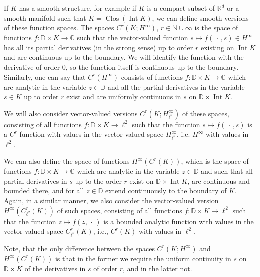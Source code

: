 \documentclass[12pt]{amsart}
\begin{document}
{\begin{list}{X}
{If \(K\) has a smooth structure, for example if \(K\) is a compact subset of ${\mathbb{R}}^d$ or a smooth manifold such that $K ={\operatorname{Clos}} \left({\operatorname{Int}} K\right)$, we can define smooth versions of these function spaces.  The spaces $C^r\left(K;H^\infty\right)$, $r\in {\mathbb{N}}\cup\infty$ is the space of functions $f:{\mathbb{D}}\times K\to {\mathbb{C}}$ such that the vector-valued function $s\mapsto f({\,\cdot\,}, s)\in H^\infty$  has all its partial derivatives (in the strong sense) up to order $r$ existing on ${\operatorname{Int}} K$  and are continuous up to the boundary.  We will identify the function with the derivative of order $0$, so the function itself is continuous up to the boundary. Similarly, one can say that $C^r\left(H^\infty\right)$ consists of functions $f:{\mathbb{D}}\times K\to {\mathbb{C}}$ which are analytic in the variable $z\in {\mathbb{D}}$ and all the partial derivatives in the variable $s\in K$ up to order $r$ exist and are uniformly continuous in $s$ on ${\mathbb{D}}\times {\operatorname{Int}} K$. 

We will also consider vector-valued versions $C^r \left(K; H^\infty_{\ell^2}\right)$ of these spaces, consisting of all functions $f : {\mathbb{D}}\times K \to \ell^2$ such that the function $s \mapsto f({\,\cdot\,}, s) $ is a $C^r$ function with values in the vector-valued space $H^\infty_{\ell^2}$, i.e. $H^\infty$ with values in  $\ell^2$. 

We can also define the space of functions $H^\infty(C^r(K))$, which is the space of functions $f:{\mathbb{D}}\times K\to {\mathbb{C}}$ which are analytic in the variable $z\in {\mathbb{D}}$ and such that all partial derivatives in $s$ up to the order $r$ exist  on ${\mathbb{D}}\times {\operatorname{Int}} K$, are  continuous and bounded there, and for all $z\in {\mathbb{D}}$ extend continuously to the boundary of $K$.   Again, in a similar manner, we also consider the vector-valued version $H^\infty \left(C^r_{\ell^2}(K)\right) $ of such spaces, consisting of all functions $f :{\mathbb{D}}\times K \to \ell^2$ such that the function $z\mapsto f(z, {\,\cdot\,})$ is a bounded analytic function with values in the vector-valued space $C^r_{\ell^2}(K)$, i.e., $C^r(K)$ with values in $\ell^2$. 

Note, that the only difference between the spaces $C^r\left(K;H^\infty\right)$ and $H^\infty\left(C^r(K)\right)$ is that in the former we require the uniform continuity in $s$ on ${\mathbb{D}}\times K$ of the derivatives in $s$ of order $r$, and in the latter not.  

}
\end{list}}
\end{document}

